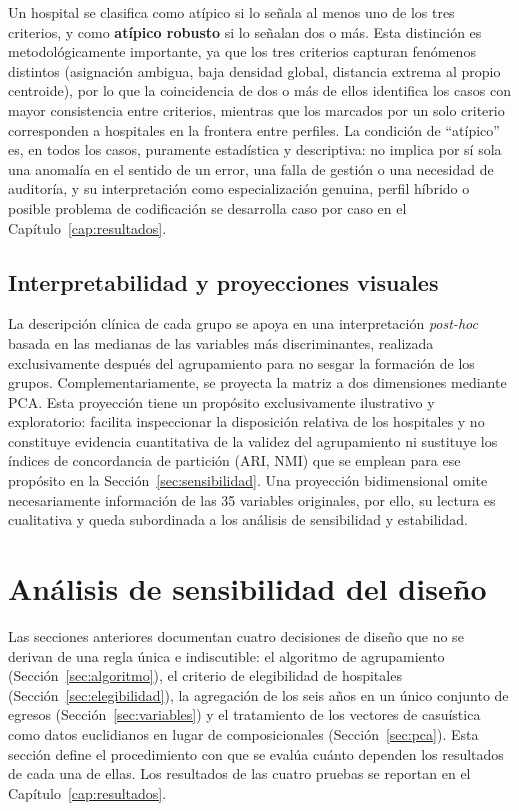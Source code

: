 Un hospital se clasifica como atípico si lo señala al menos uno de los
tres criterios, y como \textbf{atípico robusto} si lo señalan dos o más. Esta
distinción es metodológicamente importante, ya que los tres criterios capturan fenómenos
distintos (asignación ambigua, baja densidad global, distancia extrema al
propio centroide), por lo que la coincidencia de dos o más de ellos identifica los casos con mayor
consistencia entre criterios, mientras que los
marcados por un solo criterio corresponden a hospitales en la frontera entre
perfiles. La condición de ``atípico'' es, en todos los casos, puramente
estadística y descriptiva: no implica por sí sola una anomalía en el sentido
de un error, una falla de gestión o una necesidad de auditoría, y su
interpretación como especialización genuina, perfil híbrido o posible
problema de codificación se desarrolla caso por caso en el
Capítulo~\ref{cap:resultados}.

\subsection{Interpretabilidad y proyecciones visuales}
\label{sec:interpretabilidad-metodo}

La descripción clínica de cada grupo se apoya en una interpretación
\textit{post-hoc} basada en las medianas de las variables más discriminantes,
realizada exclusivamente después del agrupamiento para no sesgar la formación de
los grupos. Complementariamente, se proyecta la matriz a dos dimensiones
mediante PCA. Esta proyección tiene un propósito exclusivamente ilustrativo y
exploratorio: facilita inspeccionar la disposición relativa de los hospitales y
no constituye evidencia cuantitativa de la validez del agrupamiento ni sustituye
los índices de concordancia de partición (ARI, NMI) que se emplean para ese
propósito en la Sección~\ref{sec:sensibilidad}. Una proyección bidimensional
omite necesariamente información de las 35 variables originales, por ello, su
lectura es cualitativa y queda subordinada a los análisis de sensibilidad y
estabilidad.

\section{Análisis de sensibilidad del diseño}
\label{sec:sensibilidad-diseno}

Las secciones anteriores documentan cuatro decisiones de diseño que no se derivan
de una regla única e indiscutible: el algoritmo de agrupamiento
(Sección~\ref{sec:algoritmo}), el criterio de elegibilidad de hospitales
(Sección~\ref{sec:elegibilidad}), la agregación de los seis años en un único
conjunto de egresos (Sección~\ref{sec:variables}) y el tratamiento de los
vectores de casuística como datos euclidianos en lugar de composicionales
(Sección~\ref{sec:pca}). Esta sección define el procedimiento con que se evalúa
cuánto dependen los resultados de cada una de ellas. Los resultados de las cuatro
pruebas se reportan en el Capítulo~\ref{cap:resultados}.

